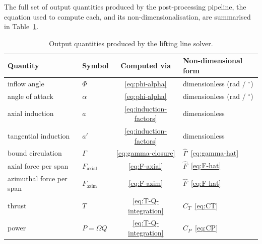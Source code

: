 The full set of output quantities produced by the post-processing pipeline, the equation used to compute each, and its non-dimensionalisation, are summarised in Table~\ref{tab:outputs}.

\begin{table}[H]
\centering
\caption{Output quantities produced by the lifting line solver.}
\label{tab:outputs}
\begin{tabular}{@{}llcl@{}}
\toprule
Quantity & Symbol & Computed via & Non-dimensional form \\ \midrule
inflow angle           & $\Phi$         & \eqref{eq:phi-alpha}                & dimensionless (rad / $^\circ$) \\
angle of attack        & $\alpha$       & \eqref{eq:phi-alpha}                & dimensionless (rad / $^\circ$) \\
axial induction        & $a$            & \eqref{eq:induction-factors}        & dimensionless \\
tangential induction   & $a'$           & \eqref{eq:induction-factors}        & dimensionless \\
bound circulation      & $\Gamma$       & \eqref{eq:gamma-closure}            & $\hat{\Gamma}$~\eqref{eq:gamma-hat} \\
axial force per span   & $F_{\text{axial}}$ & \eqref{eq:F-axial}              & $\hat{F}$~\eqref{eq:F-hat} \\
azimuthal force per span & $F_{\text{azim}}$ & \eqref{eq:F-azim}             & $\hat{F}$~\eqref{eq:F-hat} \\
thrust                 & $T$            & \eqref{eq:T-Q-integration}          & $C_T$~\eqref{eq:CT} \\
power                  & $P=\Omega Q$   & \eqref{eq:T-Q-integration}          & $C_P$~\eqref{eq:CP} \\
\bottomrule
\end{tabular}
\end{table}